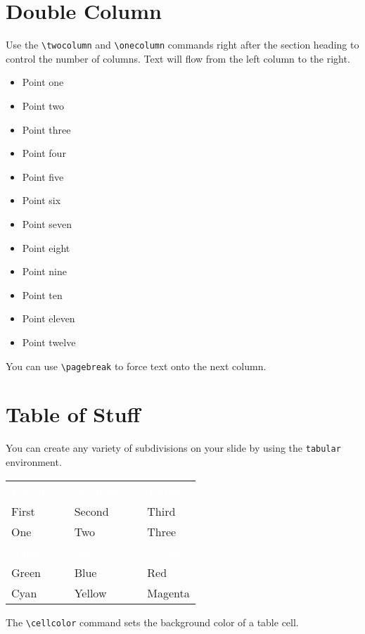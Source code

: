 \documentclass{sysubeamer}
\begin{document}
\section{Double Column}\twocolumn\raggedright

Use the \verb|\twocolumn| and \verb|\onecolumn| commands right after the section
heading to control the number of columns. Text will flow from the left column to
the right.
\begin{itemize}
    \item Point one
    \item Point two
    \item Point three
    \item Point four
    \item Point five
    \item Point six
    \item Point seven
    \item Point eight
    \item Point nine
    \item Point ten
    \item Point eleven
    \item Point twelve
\end{itemize}
You can use \verb|\pagebreak| to force text onto the next column.

\section{Table of Stuff}

You can create any variety of subdivisions on your slide by using the
\verb|tabular| environment.
\begin{center}
\begin{tabular}{C{0.25\textwidth}cC{0.25\textwidth}cC{0.25\textwidth}}
    \textcolor{white}{Primary} &&
    \textcolor{white}{Secondary} &&
    \textcolor{white}{Tertiary} \\
    First && Second && Third \\
    One && Two && Three \\[1em]
    \textcolor{white}{Alpha} &&
    \textcolor{white}{Beta} &&
    \textcolor{white}{Gamma} \\
    Green && Blue && Red \\
    Cyan && Yellow && Magenta
\end{tabular}
\end{center}
The \verb|\cellcolor| command sets the background color of a table cell.
\end{document}
